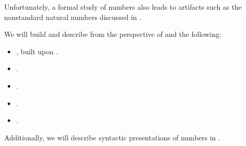Unfortunately, a formal study of numbers also leads to artifacts such as the nonstandard natural numbers discussed in .

We will build and describe from the perspective of  and  the following:
\begin{itemize}
  \item {}, built upon .
  \item {}.
  \item {}.
  \item {}.
  \item {}.
\end{itemize}

Additionally, we will describe syntactic presentations of numbers in .
